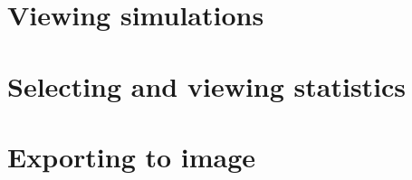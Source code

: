 \section{Viewing simulations}
\label{section:viewing}




\section{Selecting and viewing statistics}
\label{section:stats_selection}




\section{Exporting to image}
\label{section:export_image}


